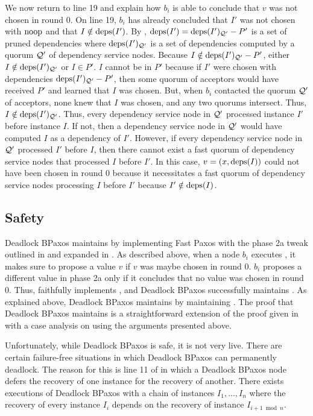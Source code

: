 We now return to line 19 and explain how $b_i$ is able to conclude that $v$ was
not chosen in round $0$. On line 19, $b_i$ has already concluded that $I'$ was
not chosen with $\text{noop}$ and that $I \notin \text{deps}(I')$. By
, $\text{deps}(I') = \text{deps}(I')_{\mathcal{Q}'} - P'$ is a set
of pruned dependencies where $\text{deps}(I')_{\mathcal{Q}'}$ is a set of dependencies
computed by a quorum $\mathcal{Q}'$ of dependency service nodes. Because $I \notin
\text{deps}(I')_{\mathcal{Q}'} - P'$, either $I \notin \text{deps}(I')_{\mathcal{Q}'}$ or $I \in
P'$.
%
$I$ cannot be in $P'$ because if $I'$ were chosen with dependencies
$\text{deps}(I')_{\mathcal{Q}'} - P'$, then some quorum of acceptors would have received
$P'$ and learned that $I$ was chosen. But, when $b_i$ contacted the quorum
$\mathcal{Q}'$ of acceptors, none knew that $I$ was chosen, and any two quorums
intersect.
%
Thus, $I \notin \text{deps}(I')_{\mathcal{Q}'}$. Thus, every dependency service node in
$\mathcal{Q}'$ processed instance $I'$ before instance $I$. If not, then a
dependency service node in $\mathcal{Q}'$ would have computed $I$ as a dependency
of $I'$. However, if every dependency service node in $\mathcal{Q}'$ processed $I'$
before $I$, then there cannot exist a fast quorum of dependency service nodes
that processed $I$ before $I'$. In this case, $v = (x, \text{deps}(I))$ could not
have been chosen in round $0$ because it necessitates a fast quorum of
dependency service nodes processing $I$ before $I'$ because $I' \notin
\text{deps}(I)$.

\subsection{Safety}
Deadlock BPaxos maintains  by implementing Fast
Paxos with the phase 2a tweak outlined in  and expanded
in . As described above, when a node $b_i$ executes
, it makes sure to propose a value $v$ if $v$ was maybe
chosen in round $0$. $b_i$ proposes a different value in phase 2a only if it
concludes that no value was chosen in round $0$. Thus, 
faithfully implements , and Deadlock BPaxos
successfully maintains .
%
As explained above, Deadlock BPaxos maintains  by
maintaining . The proof that Deadlock BPaxos
maintains  is a straightforward extension of the
proof given in  with a case analysis on
 using the arguments presented above.

Unfortunately, while Deadlock BPaxos is safe, it is not very live. There are
certain failure-free situations in which Deadlock BPaxos can permanently
deadlock. The reason for this is line 11 of  in which a
Deadlock BPaxos node defers the recovery of one instance for the recovery of
another. There exists executions of Deadlock BPaxos with a chain of instances
$I_1, \ldots, I_n$ where the recovery of every instance $I_i$ depends on the
recovery of instance $I_{i+1 \bmod n}$.
